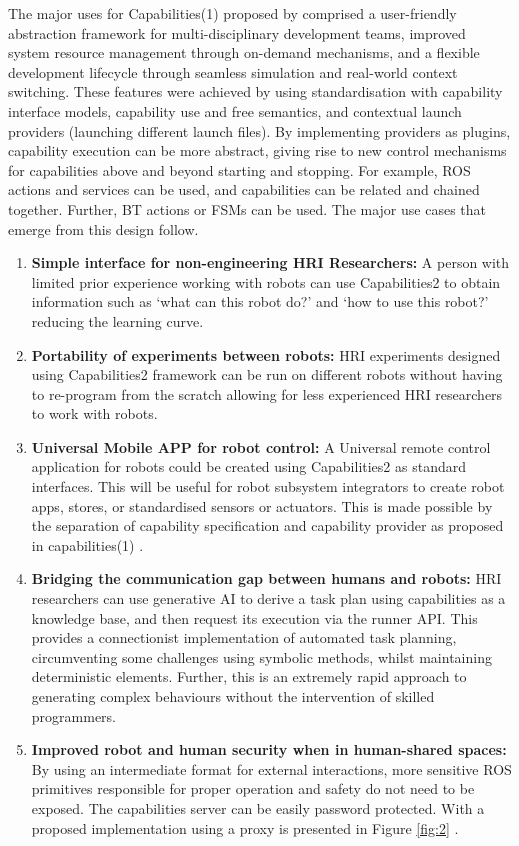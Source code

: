 \documentclass[conference]{IEEEtran}
\begin{document}
The major uses for Capabilities(1) proposed by \cite{woodall2014ros} comprised a user-friendly abstraction framework for multi-disciplinary development teams, improved system resource management through on-demand mechanisms, and a flexible development lifecycle through seamless simulation and real-world context switching. These features were achieved by using standardisation with capability interface models, capability use and free semantics, and contextual launch providers (launching different launch files). By implementing providers as plugins, capability execution can be more abstract, giving rise to new control mechanisms for capabilities above and beyond starting and stopping. For example, ROS actions and services can be used, and capabilities can be related and chained together. Further, BT actions or FSMs can be used. The major use cases that emerge from this design follow.

\begin{enumerate}
    \item \textbf{Simple interface for non-engineering HRI Researchers:}
    A person with limited prior experience working with robots can use Capabilities2 to obtain information such as ‘what can this robot do?’ and ‘how to use this robot?’ reducing the learning curve.
    \item \textbf{Portability of experiments between robots:}
    HRI experiments designed using Capabilities2 framework can be run on different robots without having to re-program from the scratch allowing for less experienced HRI researchers to work with robots.
    \item \textbf{Universal Mobile APP for robot control:}
    A Universal remote control application for robots could be created using Capabilities2 as standard interfaces. This will be useful for robot subsystem integrators to create robot apps, stores, or standardised sensors or actuators. This is made possible by the separation of capability specification and capability provider as proposed in capabilities(1) \cite{woodall2014ros}.
    \item \textbf{Bridging the communication gap between humans and robots:}
    HRI researchers can use generative AI to derive a task plan using capabilities as a knowledge base, and then request its execution via the runner API. This provides a connectionist implementation of automated task planning, circumventing some challenges using symbolic methods, whilst maintaining deterministic elements. Further, this is an extremely rapid approach to generating complex behaviours without the intervention of skilled programmers.
    \item \textbf{Improved robot and human security when in human-shared spaces:}
    By using an intermediate format for external interactions, more sensitive ROS primitives responsible for proper operation and safety do not need to be exposed. The capabilities server can be easily password protected. With a proposed implementation using a proxy is presented in Figure \ref{fig:2} \cite{crick2012ros}.   
\end{enumerate} 
\end{document}
